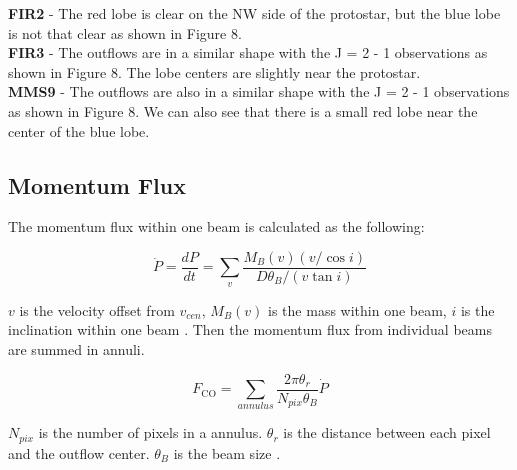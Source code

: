  
\noindent \textbf{FIR2} - The red lobe is clear on the NW side of the protostar, but the blue lobe is not that clear as shown in Figure 8.\\
\textbf{FIR3} - The outflows are in a similar shape with the J = 2 - 1 observations as shown in Figure 8. The lobe centers are slightly near the protostar.\\
\textbf{MMS9} - The outflows are also in a similar shape with the J = 2 - 1 observations as shown in Figure 8. We can also see that there is a small red lobe near the center of the blue lobe.\\
\newpage

\subsection{Momentum Flux}

The momentum flux within one beam is calculated as the following:

\begin{equation}
\dot{P} = \frac{dP}{dt} = \sum_{v} {\frac{M_B (v) (v/ \cos i)}{D\theta_B / (v \tan i)}}
\end{equation}

$v$ is the velocity offset from $v_{cen}$, $M_B (v)$ is the mass within one beam, $i$ is the inclination within one beam \cite{hatchell2007star}.
Then the momentum flux from individual beams are summed in annuli. 

\begin{equation}
F_{\textrm{CO}} = \sum _{annulus} \frac{2\pi \theta_r}{N_{pix}\theta_B}\dot{P}	
\end{equation}

$N_{pix}$ is the number of pixels in a annulus. $\theta_r$ is the distance between each pixel and the outflow center. $\theta_B$ is the beam size \cite{hatchell2007star, van2013outflow}.


